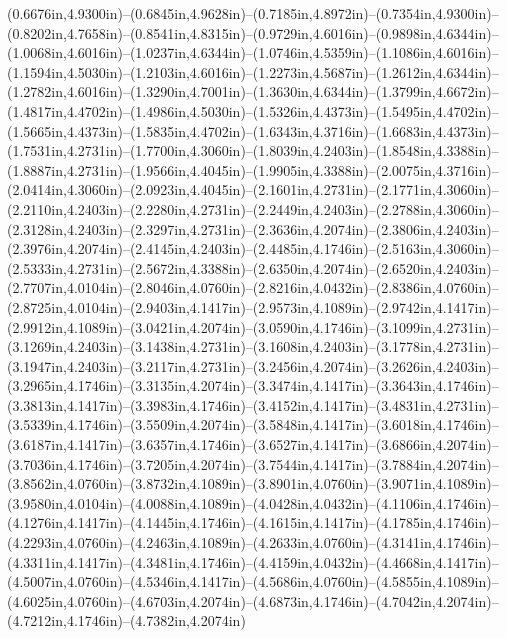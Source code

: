 (0.6676in,4.9300in)--(0.6845in,4.9628in)--(0.7185in,4.8972in)--(0.7354in,4.9300in)--(0.8202in,4.7658in)--(0.8541in,4.8315in)--(0.9729in,4.6016in)--(0.9898in,4.6344in)--(1.0068in,4.6016in)--(1.0237in,4.6344in)--(1.0746in,4.5359in)--(1.1086in,4.6016in)--(1.1594in,4.5030in)--(1.2103in,4.6016in)--(1.2273in,4.5687in)--(1.2612in,4.6344in)--(1.2782in,4.6016in)--(1.3290in,4.7001in)--(1.3630in,4.6344in)--(1.3799in,4.6672in)--(1.4817in,4.4702in)--(1.4986in,4.5030in)--(1.5326in,4.4373in)--(1.5495in,4.4702in)--(1.5665in,4.4373in)--(1.5835in,4.4702in)--(1.6343in,4.3716in)--(1.6683in,4.4373in)--(1.7531in,4.2731in)--(1.7700in,4.3060in)--(1.8039in,4.2403in)--(1.8548in,4.3388in)--(1.8887in,4.2731in)--(1.9566in,4.4045in)--(1.9905in,4.3388in)--(2.0075in,4.3716in)--(2.0414in,4.3060in)--(2.0923in,4.4045in)--(2.1601in,4.2731in)--(2.1771in,4.3060in)--(2.2110in,4.2403in)--(2.2280in,4.2731in)--(2.2449in,4.2403in)--(2.2788in,4.3060in)--(2.3128in,4.2403in)--(2.3297in,4.2731in)--(2.3636in,4.2074in)--(2.3806in,4.2403in)--(2.3976in,4.2074in)--(2.4145in,4.2403in)--(2.4485in,4.1746in)--(2.5163in,4.3060in)--(2.5333in,4.2731in)--(2.5672in,4.3388in)--(2.6350in,4.2074in)--(2.6520in,4.2403in)--(2.7707in,4.0104in)--(2.8046in,4.0760in)--(2.8216in,4.0432in)--(2.8386in,4.0760in)--(2.8725in,4.0104in)--(2.9403in,4.1417in)--(2.9573in,4.1089in)--(2.9742in,4.1417in)--(2.9912in,4.1089in)--(3.0421in,4.2074in)--(3.0590in,4.1746in)--(3.1099in,4.2731in)--(3.1269in,4.2403in)--(3.1438in,4.2731in)--(3.1608in,4.2403in)--(3.1778in,4.2731in)--(3.1947in,4.2403in)--(3.2117in,4.2731in)--(3.2456in,4.2074in)--(3.2626in,4.2403in)--(3.2965in,4.1746in)--(3.3135in,4.2074in)--(3.3474in,4.1417in)--(3.3643in,4.1746in)--(3.3813in,4.1417in)--(3.3983in,4.1746in)--(3.4152in,4.1417in)--(3.4831in,4.2731in)--(3.5339in,4.1746in)--(3.5509in,4.2074in)--(3.5848in,4.1417in)--(3.6018in,4.1746in)--(3.6187in,4.1417in)--(3.6357in,4.1746in)--(3.6527in,4.1417in)--(3.6866in,4.2074in)--(3.7036in,4.1746in)--(3.7205in,4.2074in)--(3.7544in,4.1417in)--(3.7884in,4.2074in)--(3.8562in,4.0760in)--(3.8732in,4.1089in)--(3.8901in,4.0760in)--(3.9071in,4.1089in)--(3.9580in,4.0104in)--(4.0088in,4.1089in)--(4.0428in,4.0432in)--(4.1106in,4.1746in)--(4.1276in,4.1417in)--(4.1445in,4.1746in)--(4.1615in,4.1417in)--(4.1785in,4.1746in)--(4.2293in,4.0760in)--(4.2463in,4.1089in)--(4.2633in,4.0760in)--(4.3141in,4.1746in)--(4.3311in,4.1417in)--(4.3481in,4.1746in)--(4.4159in,4.0432in)--(4.4668in,4.1417in)--(4.5007in,4.0760in)--(4.5346in,4.1417in)--(4.5686in,4.0760in)--(4.5855in,4.1089in)--(4.6025in,4.0760in)--(4.6703in,4.2074in)--(4.6873in,4.1746in)--(4.7042in,4.2074in)--(4.7212in,4.1746in)--(4.7382in,4.2074in) 